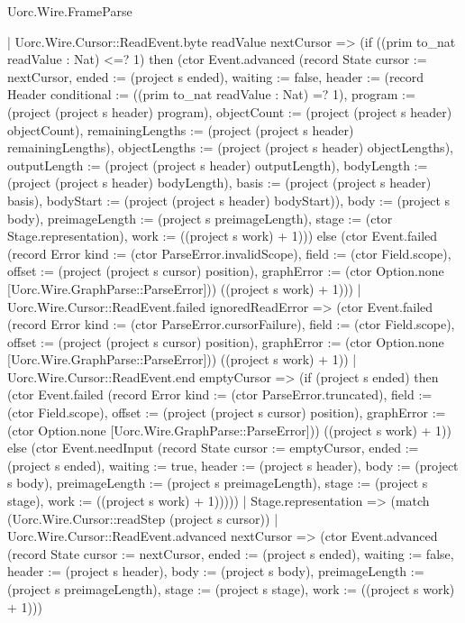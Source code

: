 \begin{lexlean}{Uorc.Wire.FrameParse}
\begin{semanticmodule}
{      | Uorc.Wire.Cursor::ReadEvent.byte readValue nextCursor => (if ((prim to_nat readValue : Nat) <=? 1) then (ctor Event.advanced (record State {cursor := nextCursor, ended := (project s ended), waiting := false, header := (record Header {conditional := ((prim to_nat readValue : Nat) =? 1), program := (project (project s header) program), objectCount := (project (project s header) objectCount), remainingLengths := (project (project s header) remainingLengths), objectLengths := (project (project s header) objectLengths), outputLength := (project (project s header) outputLength), bodyLength := (project (project s header) bodyLength), basis := (project (project s header) basis), bodyStart := (project (project s header) bodyStart)}), body := (project s body), preimageLength := (project s preimageLength), stage := (ctor Stage.representation), work := ((project s work) + 1)})) else (ctor Event.failed (record Error {kind := (ctor ParseError.invalidScope), field := (ctor Field.scope), offset := (project (project s cursor) position), graphError := (ctor Option.none [Uorc.Wire.GraphParse::ParseError])}) ((project s work) + 1)))
      | Uorc.Wire.Cursor::ReadEvent.failed ignoredReadError => (ctor Event.failed (record Error {kind := (ctor ParseError.cursorFailure), field := (ctor Field.scope), offset := (project (project s cursor) position), graphError := (ctor Option.none [Uorc.Wire.GraphParse::ParseError])}) ((project s work) + 1))
      | Uorc.Wire.Cursor::ReadEvent.end emptyCursor => (if (project s ended) then (ctor Event.failed (record Error {kind := (ctor ParseError.truncated), field := (ctor Field.scope), offset := (project (project s cursor) position), graphError := (ctor Option.none [Uorc.Wire.GraphParse::ParseError])}) ((project s work) + 1)) else (ctor Event.needInput (record State {cursor := emptyCursor, ended := (project s ended), waiting := true, header := (project s header), body := (project s body), preimageLength := (project s preimageLength), stage := (project s stage), work := ((project s work) + 1)}))))
    | Stage.representation => (match (Uorc.Wire.Cursor::readStep (project s cursor))
      | Uorc.Wire.Cursor::ReadEvent.advanced nextCursor => (ctor Event.advanced (record State {cursor := nextCursor, ended := (project s ended), waiting := false, header := (project s header), body := (project s body), preimageLength := (project s preimageLength), stage := (project s stage), work := ((project s work) + 1)}))
}
\end{semanticmodule}
\end{lexlean}
